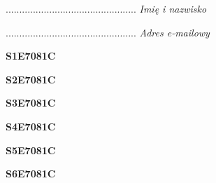 \begin{turn}{90}\begin{minipage}{\linewidth} \vspace{20mm} ................................................  \textit{Imię i nazwisko}\end{minipage}\end{turn}

\begin{turn}{90}\begin{minipage}{\linewidth} \vspace{20mm} ................................................  \textit{Adres e-mailowy}\end{minipage}\end{turn}

\begin{turn}{90}\huge \begin{minipage}{\linewidth} \vspace{10mm}\textbf{S1E7081C}\end{minipage}\end{turn}

\begin{turn}{90}\huge \begin{minipage}{\linewidth} \vspace{10mm}\textbf{S2E7081C}\end{minipage}\end{turn}

\begin{turn}{90}\huge \begin{minipage}{\linewidth} \vspace{10mm}\textbf{S3E7081C}\end{minipage}\end{turn}

\begin{turn}{90}\huge \begin{minipage}{\linewidth} \vspace{10mm}\textbf{S4E7081C}\end{minipage}\end{turn}

\begin{turn}{90}\huge \begin{minipage}{\linewidth} \vspace{10mm}\textbf{S5E7081C}\end{minipage}\end{turn}

\begin{turn}{90}\huge \begin{minipage}{\linewidth} \vspace{10mm}\textbf{S6E7081C}\end{minipage}\end{turn}

